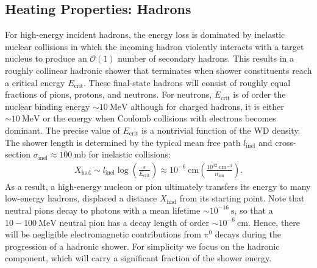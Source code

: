 \documentclass[twocolumn,showpacs,preprintnumbers,amsmath,amssymb,prd]{revtex4}
\newcommand{\OO}{\mathcal{O}}
\newcommand{\MeV}{\text{MeV}}
\def\r{\right)}
\def\l{\left(}
\begin{document}
\subsection{Heating Properties: Hadrons}

For high-energy incident hadrons, the energy loss is dominated by inelastic nuclear collisions in which the incoming hadron violently interacts with a target nucleus to produce an $\OO(1)$ number of secondary hadrons.
This results in a roughly collinear hadronic shower that terminates when shower constituents reach a critical energy $E_\text{crit}$.
These final-state hadrons will consist of roughly equal fractions of pions, protons, and neutrons. 
For neutrons, $E_\text{crit}$ is of order the nuclear binding energy $\sim 10 ~\text{MeV}$ although for charged hadrons, it is either $\sim 10 ~\MeV$ or the energy when Coulomb collisions with electrons becomes dominant. 
The precise value of $E_\text{crit}$ is a nontrivial function of the WD density. 
The shower length is determined by the typical mean free path $l_\text{inel}$ and cross-section $\sigma_\text{inel} \approx 100 ~\text{mb}$ for inelastic collisions:
\begin{align}
\label{eq:hadlength}
  X_\text{had} \sim l_\text{inel} \log\l\frac{\epsilon}{E_\text{crit}}\r
  \approx 10^{-6} ~\text{cm} \l\frac{10^{32}~\text{cm}^{-3}}{n_\text{ion}}\r. 
\end{align}
As a result, a high-energy nucleon or pion ultimately transfers its energy to many low-energy hadrons, displaced a distance $X_\text{had}$ from its starting point.
Note that neutral pions decay to photons with a mean lifetime $\sim 10^{-16} ~\text{s}$, so that a $10 - 100 ~\text{MeV}$ neutral pion has a decay length of order $\sim 10^{-6} ~\text{cm}$.
Hence, there will be negligible electromagnetic contributions from $\pi^0$ decays during the progression of a hadronic shower. 
For simplicity we focus on the hadronic component, which will carry a significant fraction of the shower energy.  
\end{document}
